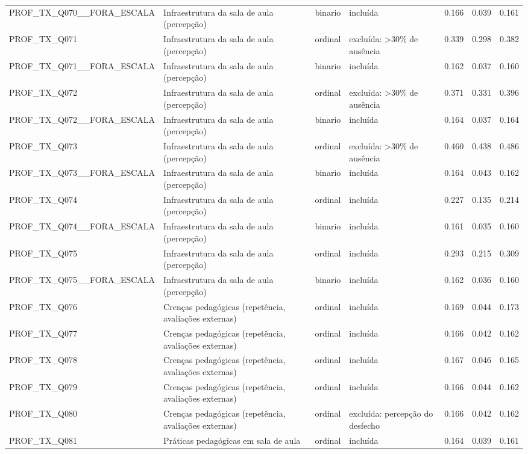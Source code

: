 \begin{tabular}{llllrrr}
PROF\_TX\_Q070\_\_FORA\_ESCALA & Infraestrutura da sala de aula (percepção) & binario & incluída & 0.166 & 0.039 & 0.161 \\
PROF\_TX\_Q071 & Infraestrutura da sala de aula (percepção) & ordinal & excluída: >30\% de ausência & 0.339 & 0.298 & 0.382 \\
PROF\_TX\_Q071\_\_FORA\_ESCALA & Infraestrutura da sala de aula (percepção) & binario & incluída & 0.162 & 0.037 & 0.160 \\
PROF\_TX\_Q072 & Infraestrutura da sala de aula (percepção) & ordinal & excluída: >30\% de ausência & 0.371 & 0.331 & 0.396 \\
PROF\_TX\_Q072\_\_FORA\_ESCALA & Infraestrutura da sala de aula (percepção) & binario & incluída & 0.164 & 0.037 & 0.164 \\
PROF\_TX\_Q073 & Infraestrutura da sala de aula (percepção) & ordinal & excluída: >30\% de ausência & 0.460 & 0.438 & 0.486 \\
PROF\_TX\_Q073\_\_FORA\_ESCALA & Infraestrutura da sala de aula (percepção) & binario & incluída & 0.164 & 0.043 & 0.162 \\
PROF\_TX\_Q074 & Infraestrutura da sala de aula (percepção) & ordinal & incluída & 0.227 & 0.135 & 0.214 \\
PROF\_TX\_Q074\_\_FORA\_ESCALA & Infraestrutura da sala de aula (percepção) & binario & incluída & 0.161 & 0.035 & 0.160 \\
PROF\_TX\_Q075 & Infraestrutura da sala de aula (percepção) & ordinal & incluída & 0.293 & 0.215 & 0.309 \\
PROF\_TX\_Q075\_\_FORA\_ESCALA & Infraestrutura da sala de aula (percepção) & binario & incluída & 0.162 & 0.036 & 0.160 \\
PROF\_TX\_Q076 & Crenças pedagógicas (repetência, avaliações externas) & ordinal & incluída & 0.169 & 0.044 & 0.173 \\
PROF\_TX\_Q077 & Crenças pedagógicas (repetência, avaliações externas) & ordinal & incluída & 0.166 & 0.042 & 0.162 \\
PROF\_TX\_Q078 & Crenças pedagógicas (repetência, avaliações externas) & ordinal & incluída & 0.167 & 0.046 & 0.165 \\
PROF\_TX\_Q079 & Crenças pedagógicas (repetência, avaliações externas) & ordinal & incluída & 0.166 & 0.044 & 0.162 \\
PROF\_TX\_Q080 & Crenças pedagógicas (repetência, avaliações externas) & ordinal & excluída: percepção do desfecho & 0.166 & 0.042 & 0.162 \\
PROF\_TX\_Q081 & Práticas pedagógicas em sala de aula & ordinal & incluída & 0.164 & 0.039 & 0.161 \\

\end{tabular}
